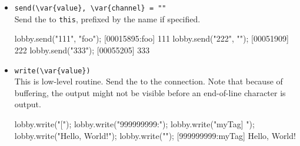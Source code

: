 \begin{itemize}
\item \lstinline|send(\var{value}, \var{channel} = ""|\\
  Send the   to \lstinline|this|,
  prefixed by the   name if specified.
\begin{urbiscript}[firstnumber=last]
lobby.send("111", "foo");
[00015895:foo] 111
lobby.send("222", "");
[00051909] 222
lobby.send("333");
[00055205] 333
\end{urbiscript}

\item \lstinline|write(\var{value})|\\
  This is low-level routine.  Send the  
  to the connection.  Note that because of buffering, the output might
  not be visible before an end-of-line character is output.
\begin{urbiscript}[firstnumber=last]
lobby.write("[");
lobby.write("999999999:");
lobby.write("myTag] ");
lobby.write("Hello, World!");
lobby.write("\n");
[999999999:myTag] Hello, World!
\end{urbiscript}
\end{itemize}

